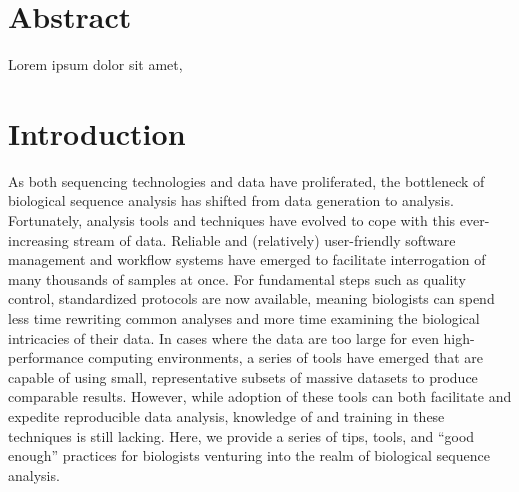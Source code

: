 \documentclass[10pt,letterpaper]{article}
\begin{document}
\section*{Abstract}
Lorem ipsum dolor sit amet, %




\linenumbers

\section*{Introduction}

As both sequencing technologies and data have proliferated, the bottleneck of biological sequence analysis has shifted from data generation to analysis. 
Fortunately, analysis tools and techniques have evolved to cope with this ever-increasing stream of data. 
Reliable and (relatively) user-friendly software management and workflow systems have emerged to facilitate interrogation of many thousands of samples at once. 
For fundamental steps such as quality control, standardized protocols are now available, meaning biologists can spend less time rewriting common analyses and more time examining the biological intricacies of their data. 
In cases where the data are too large for even high-performance computing environments, a series of tools have emerged that are capable of using small, representative subsets of massive datasets to produce comparable results. 
However, while adoption of these tools can both facilitate and expedite reproducible data analysis, knowledge of and training in these techniques is still lacking. 
Here, we provide a series of tips, tools, and “good enough” practices for biologists venturing into the realm of biological sequence analysis.
\end{document}

